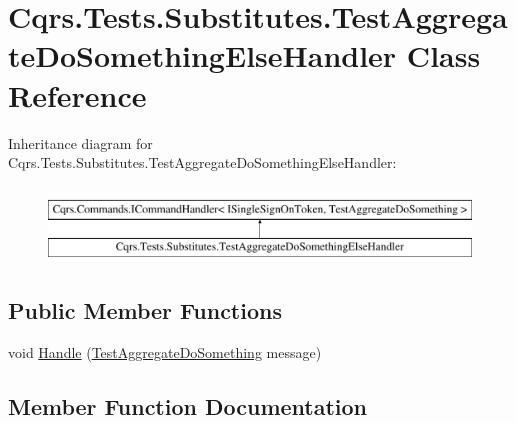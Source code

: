 \hypertarget{classCqrs_1_1Tests_1_1Substitutes_1_1TestAggregateDoSomethingElseHandler}{}\section{Cqrs.\+Tests.\+Substitutes.\+Test\+Aggregate\+Do\+Something\+Else\+Handler Class Reference}
\label{classCqrs_1_1Tests_1_1Substitutes_1_1TestAggregateDoSomethingElseHandler}
Inheritance diagram for Cqrs.\+Tests.\+Substitutes.\+Test\+Aggregate\+Do\+Something\+Else\+Handler\+:\begin{figure}[H]
\begin{center}
\leavevmode
\includegraphics[height=2.000000cm]{classCqrs_1_1Tests_1_1Substitutes_1_1TestAggregateDoSomethingElseHandler}
\end{center}
\end{figure}
\subsection*{Public Member Functions}
\begin{DoxyCompactItemize}
\item 
void \hyperlink{classCqrs_1_1Tests_1_1Substitutes_1_1TestAggregateDoSomethingElseHandler_a513bed5d82a997c4b5df4fb77a449ae9_a513bed5d82a997c4b5df4fb77a449ae9}{Handle} (\hyperlink{classCqrs_1_1Tests_1_1Substitutes_1_1TestAggregateDoSomething}{Test\+Aggregate\+Do\+Something} message)
\end{DoxyCompactItemize}


\subsection{Member Function Documentation}
\mbox{\label{classCqrs_1_1Tests_1_1Substitutes_1_1TestAggregateDoSomethingElseHandler_a513bed5d82a997c4b5df4fb77a449ae9_a513bed5d82a997c4b5df4fb77a449ae9}} 
